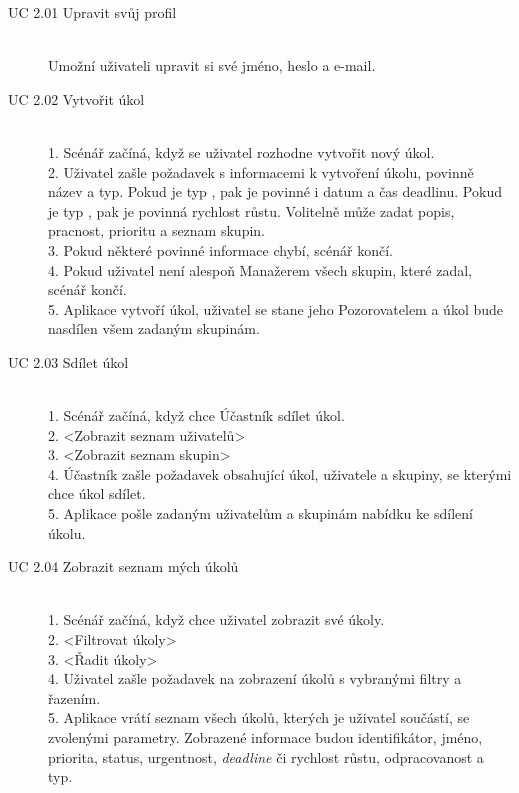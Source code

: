 \documentclass[thesis=B,czech]{FITthesis}[2012/06/26]
\begin{document}
			\begin{description}
				\item[UC 2.01 Upravit svůj profil] \hfill \\
					Umožní uživateli upravit si své jméno, heslo a e-mail.
				
				\item[UC 2.02 Vytvořit úkol] \hfill \\
					1. Scénář začíná, když se uživatel rozhodne vytvořit nový úkol. \\
					2. Uživatel zašle požadavek s informacemi k vytvoření úkolu, povinně název a typ. Pokud je typ ,  pak je povinné i datum a čas deadlinu. Pokud je typ , pak je povinná rychlost růstu. Volitelně může zadat popis, pracnost, prioritu a seznam skupin. \\
					3. Pokud některé povinné informace chybí, scénář končí. \\
					4. Pokud uživatel není alespoň Manažerem všech skupin, které zadal, scénář končí. \\
					5. Aplikace vytvoří úkol, uživatel se stane jeho Pozorovatelem a úkol bude nasdílen všem zadaným skupinám. \\
				
				\item[UC 2.03 Sdílet úkol] \hfill \\
					1. Scénář začíná, když chce Účastník sdílet úkol. \\
					2. <Zobrazit seznam uživatelů> \\
					3. <Zobrazit seznam skupin> \\
					4. Účastník zašle požadavek obsahující úkol, uživatele a skupiny, se kterými chce úkol sdílet. \\
					5. Aplikace pošle zadaným uživatelům a skupinám nabídku ke sdílení úkolu.
				
				\item[UC 2.04 Zobrazit seznam mých úkolů] \hfill \\
					1. Scénář začíná, když chce uživatel zobrazit své úkoly.\\
				    2. <Filtrovat úkoly> \\
				    3. <Řadit úkoly> \\
				    4. Uživatel zašle požadavek na zobrazení úkolů s vybranými filtry a řazením.\\
					5. Aplikace vrátí seznam všech úkolů, kterých je uživatel součástí, se zvolenými parametry. Zobrazené informace budou identifikátor, jméno, priorita, status, urgentnost, \textit{deadline} či rychlost růstu, odpracovanost a typ. \\
					

\end{description}
\end{document}
